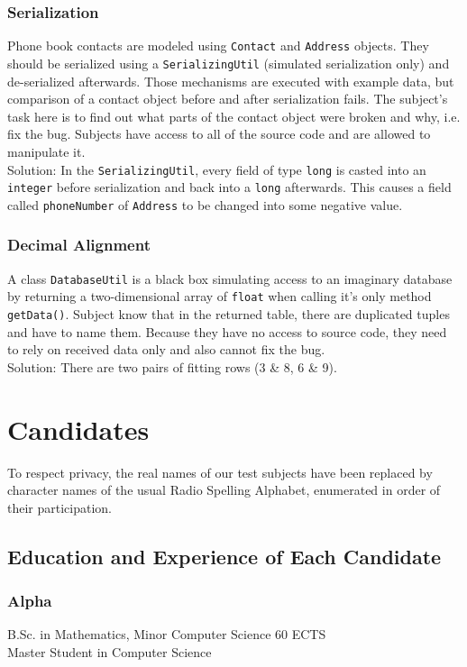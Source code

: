 \documentclass[a4paper,ngerman,english]{amsbook} %
\begin{document}
\subsubsection*{Serialization}
Phone book contacts are modeled using \verb.Contact. and \verb.Address. objects. They should be serialized using a \verb.SerializingUtil. (simulated serialization only) and de-serialized afterwards.
Those mechanisms are executed with example data, but comparison of a contact object before and after serialization fails. The subject's task here is to find out what parts of the contact object were broken and why, i.e. fix the bug. Subjects have access to all of the source code and are allowed to manipulate it.\\
Solution: In the \verb.SerializingUtil., every field of type \verb.long. is casted into an \verb.integer. before serialization and back into a \verb.long. afterwards. This causes a field called \verb.phoneNumber. of \verb.Address. to be changed into some negative value.

\subsubsection*{Decimal Alignment}
A class \verb.DatabaseUtil. is a black box simulating access to an imaginary database by returning a two-dimensional array of \verb.float. when calling it's only method \verb.getData().. Subject know that in the returned table, there are duplicated tuples and have to name them. Because they have no access to source code, they need to rely on received data only and also cannot fix the bug.\\
Solution: There are two pairs of fitting rows (3 \& 8, 6 \& 9).

\section*{Candidates}
To respect privacy, the real names of our test subjects have been replaced by character names of the usual Radio Spelling Alphabet, enumerated in order of their participation.

\subsection*{Education and Experience of Each Candidate}
\subsubsection*{Alpha} %
B.Sc. in Mathematics, Minor Computer Science 60 ECTS\\
Master Student in Computer Science
\end{document}
